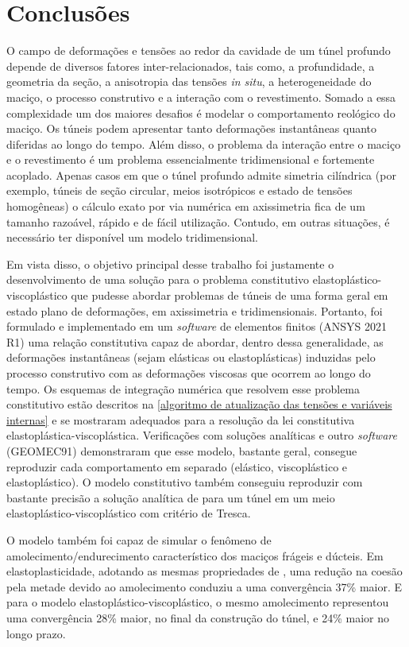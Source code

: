 \chapter{Conclusões}\label{Conclusoes}


O campo de deformações e tensões ao redor da cavidade de um túnel profundo depende de diversos fatores inter-relacionados, tais como, a profundidade, a geometria da seção, a anisotropia das tensões \textit{in situ}, a heterogeneidade do maciço, o processo construtivo e a interação com o revestimento. Somado a essa complexidade um dos maiores desafios é modelar o comportamento reológico do maciço. Os túneis podem apresentar tanto deformações instantâneas quanto diferidas ao longo do tempo. Além disso, o problema da interação entre o maciço e o revestimento é um problema essencialmente tridimensional e fortemente acoplado. Apenas casos em que o túnel profundo admite simetria cilíndrica (por exemplo, túneis de seção circular, meios isotrópicos e estado de tensões homogêneas) o cálculo exato por via numérica em axissimetria fica de um tamanho razoável, rápido e de fácil utilização. Contudo, em outras situações, é necessário ter disponível um modelo tridimensional.

Em vista disso, o objetivo principal desse trabalho foi justamente o desenvolvimento de uma solução para o problema constitutivo elastoplástico-viscoplástico que pudesse abordar problemas de túneis de uma forma geral em estado plano de deformações, em axissimetria e tridimensionais. Portanto, foi formulado e implementado em um \textit{software} de elementos finitos (ANSYS 2021 R1) uma relação constitutiva capaz de abordar, dentro dessa generalidade, as deformações instantâneas (sejam elásticas ou elastoplásticas) induzidas pelo processo construtivo com as deformações viscosas que ocorrem ao longo do tempo. Os esquemas de integração numérica que resolvem esse problema constitutivo estão descritos na \autoref{algoritmo de atualização das tensões e variáveis internas} e se mostraram adequados para a resolução da lei constitutiva elastoplástica-viscoplástica. Verificações com soluções analíticas e outro \textit{software} (GEOMEC91) demonstraram que esse modelo, bastante geral, consegue reproduzir cada comportamento em separado (elástico, viscoplástico e elastoplástico). O modelo constitutivo também conseguiu reproduzir com bastante precisão a solução analítica de  para um túnel em um meio elastoplástico-viscoplástico com critério de Tresca.

O modelo também foi capaz de simular o fenômeno de amolecimento/endurecimento característico dos maciços frágeis e dúcteis. Em elastoplasticidade, adotando as mesmas propriedades de , uma redução na coesão pela metade devido ao amolecimento conduziu a uma convergência 37\% maior. E para o modelo elastoplástico-viscoplástico, o mesmo amolecimento representou uma convergência 28\% maior, no final da construção do túnel, e 24\% maior no longo prazo.

